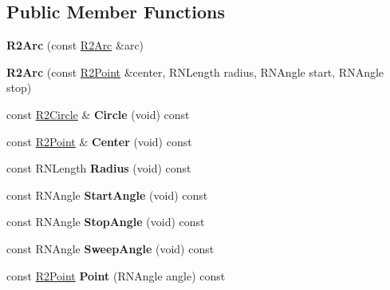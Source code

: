 \subsection*{Public Member Functions}
\begin{DoxyCompactItemize}
\item 
{\bfseries R2\+Arc} (const \hyperlink{class_r2_arc}{R2\+Arc} \&arc)\hypertarget{class_r2_arc_ae96f4dd17baf62785b2659e6a0973656}{}\label{class_r2_arc_ae96f4dd17baf62785b2659e6a0973656}

\item 
{\bfseries R2\+Arc} (const \hyperlink{class_r2_point}{R2\+Point} \&center, R\+N\+Length radius, R\+N\+Angle start, R\+N\+Angle stop)\hypertarget{class_r2_arc_aca58ac277d17dfa4b82a5a70e26defa7}{}\label{class_r2_arc_aca58ac277d17dfa4b82a5a70e26defa7}

\item 
const \hyperlink{class_r2_circle}{R2\+Circle} \& {\bfseries Circle} (void) const \hypertarget{class_r2_arc_a60fd02d6bd30e28f785a0e57d17dfd13}{}\label{class_r2_arc_a60fd02d6bd30e28f785a0e57d17dfd13}

\item 
const \hyperlink{class_r2_point}{R2\+Point} \& {\bfseries Center} (void) const \hypertarget{class_r2_arc_a76b04ddff70277a7b8b319c65251a159}{}\label{class_r2_arc_a76b04ddff70277a7b8b319c65251a159}

\item 
const R\+N\+Length {\bfseries Radius} (void) const \hypertarget{class_r2_arc_abb69ecedff2225f1812f0e1d51c63001}{}\label{class_r2_arc_abb69ecedff2225f1812f0e1d51c63001}

\item 
const R\+N\+Angle {\bfseries Start\+Angle} (void) const \hypertarget{class_r2_arc_a87ed1499c75cfeebe319fe54fd88c24d}{}\label{class_r2_arc_a87ed1499c75cfeebe319fe54fd88c24d}

\item 
const R\+N\+Angle {\bfseries Stop\+Angle} (void) const \hypertarget{class_r2_arc_a063b194c0799c458ec1fe739c8cebb2b}{}\label{class_r2_arc_a063b194c0799c458ec1fe739c8cebb2b}

\item 
const R\+N\+Angle {\bfseries Sweep\+Angle} (void) const \hypertarget{class_r2_arc_a36185350c5f5c4ab1b56c9c648f1159e}{}\label{class_r2_arc_a36185350c5f5c4ab1b56c9c648f1159e}

\item 
const \hyperlink{class_r2_point}{R2\+Point} {\bfseries Point} (R\+N\+Angle angle) const \hypertarget{class_r2_arc_a7f2ab3ff07b0554380a2a6a113ccbf1d}{}\label{class_r2_arc_a7f2ab3ff07b0554380a2a6a113ccbf1d}


\end{DoxyCompactItemize}
